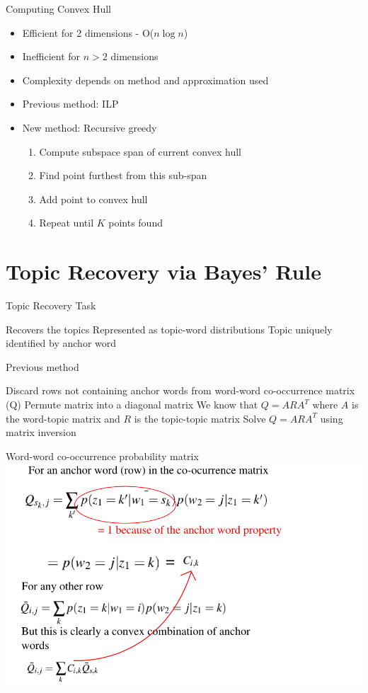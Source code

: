 \documentclass{lecture}
\begin{document}
\begin{plain}{Computing Convex Hull}
\begin{itemize}
\item Efficient for 2 dimensions - O($n\log{n}$)
\item Inefficient for $n>2$ dimensions
\item Complexity depends on method and approximation used
\item Previous method: ILP
\item New method: Recursive greedy
\begin{enumerate}
\item Compute subspace span of current convex hull
\item Find point furthest from this sub-span
\item Add point to convex hull
\item Repeat until $K$ points found
\end{enumerate}
\end{itemize}
\end{plain}

\section[Topic Recovery]{Topic Recovery via Bayes' Rule}
\begin{plain}{Topic Recovery Task}
\begin{itemize}
\p Recovers the topics
\p Represented as topic-word distributions
\p Topic uniquely identified by anchor word
\end{itemize}
\end{plain}

\begin{plain}{Previous method}
\begin{enumerate}
\p Discard rows not containing anchor words from word-word co-occurrence matrix (Q)
\p Permute matrix into a diagonal matrix
\p We know that $Q=ARA^T$ where $A$ is the word-topic matrix and $R$ is the topic-topic matrix
\p Solve $Q = ARA^T$ using matrix inversion
\end{enumerate}
\end{plain}

\begin{plain}{Word-word co-occurrence probability matrix}
\includegraphics[scale=0.5]{figs/Q}
\end{plain}
\end{document}
